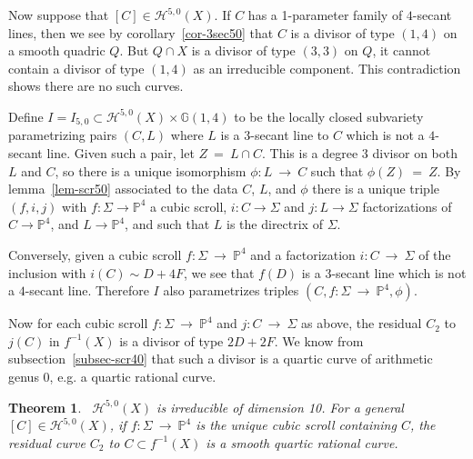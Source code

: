 \documentclass[twoside,12pt,reqno]{amsart}
\theoremstyle{plain}
\newtheorem{thm}{Theorem}[section]
\theoremstyle{definition}
\newcommand{\Hdg}[2]{\mathcal{H}^{#1,#2}}
\newcommand{\PP}{\mathbb{P}}
\def\ps{\vspace{4pt}}
\begin{document}
Now suppose that $[C]\in \Hdg{5}{0}(X)$.  If $C$ has a 1-parameter
family of $4$-secant lines, then we see by corollary~\ref{cor-3sec50}
that $C$ is a divisor of type $(1,4)$ on a smooth quadric $Q$.  But
$Q\cap X$ is a divisor of type $(3,3)$ on $Q$, it cannot contain a
divisor of type $(1,4)$ as an irreducible component.  This
contradiction shows there are no such curves.

\ps

Define $I=I_{5,0}\subset \Hdg{5}{0}(X)\times \mathbb{G}(1,4)$ to be the locally
closed subvariety parametrizing pairs $(C,L)$ where $L$ is a
$3$-secant line to $C$ which is not a $4$-secant line.  Given such a
pair, let $Z ~=~ L\cap C$.  This is a degree 3 divisor on both $L$ and
$C$,  so there is a unique isomorphism $\phi:L~\rightarrow~ C$ such
that $\phi(Z)~=~Z$.  By lemma~\ref{lem-scr50} associated to the
data $C$, $L$, and $\phi$ there is a unique triple $(f,i,j)$ with
$f:\Sigma\rightarrow \PP^4$ a cubic scroll, $i:C\rightarrow \Sigma$ and
$j:L\rightarrow \Sigma$ factorizations of $C\rightarrow \PP^4$, and 
$L\rightarrow \PP^4$, and such that $L$ is the directrix of $\Sigma$.

\ps

Conversely, given a cubic scroll $f:\Sigma~\rightarrow~ \PP^4$ and a
factorization $i:C~\rightarrow~ \Sigma$ of the inclusion with $i(C)\sim
D+4F$, we see that $f(D)$ is a $3$-secant line which is not a
$4$-secant line.  Therefore $I$ also parametrizes triples
$(C,f:\Sigma~\rightarrow~ \PP^4,\phi)$.

\ps

Now for each cubic scroll $f:\Sigma~\rightarrow~ \PP^4$ and
$j:C~\rightarrow~ \Sigma$ as above, the residual $C_2$ to $j(C)$
in $f^{-1}(X)$ is a divisor of type $2D+2F$.  We know from
subsection~\ref{subsec-scr40} that such a divisor is a quartic curve
of arithmetic genus $0$, e.g. a quartic rational curve.

\ps

\begin{thm}~\label{thm-irr50}  $\Hdg{5}{0}(X)$ is irreducible of
dimension 10.  For a 
general $[C]\in 
\Hdg{5}{0}(X)$, if $f:\Sigma~\rightarrow~ \PP^4$ is the unique cubic
scroll containing $C$, the residual curve $C_2$ to $C\subset f^{-1}(X)$ is a 
smooth quartic rational curve. 
\end{thm}
\end{document}

